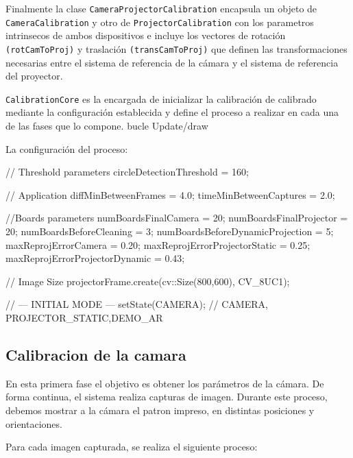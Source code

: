 Finalmente la clase \texttt{CameraProjectorCalibration} encapsula un objeto de  \texttt{CameraCalibration} y otro de \texttt{ProjectorCalibration} con los parametros intrinsecos de ambos dispositivos e incluye los vectores de rotación \texttt{(rotCamToProj)} y traslación \texttt{(transCamToProj)} que definen las transformaciones necesarias entre el sistema de referencia de la cámara y el sistema de referencia del proyector. 

\texttt{CalibrationCore} es la encargada de inicializar la calibración de calibrado mediante la configuración establecida y define el proceso a realizar en cada una de las fases que lo compone.  bucle Update/draw

La configuración del proceso:
\begin{listing}[
  float=ht,
  language = C++,
  caption  = {Configuración de la clase CalibrationCore},
  label    = code:CalibCore]
  // Threshold parameters
  circleDetectionThreshold = 160;
  
  // Application
  diffMinBetweenFrames = 4.0; 
  timeMinBetweenCaptures = 2.0; 
  
  //Boards parameters
  numBoardsFinalCamera = 20;  
  numBoardsFinalProjector = 20;
  numBoardsBeforeCleaning = 3;  
  numBoardsBeforeDynamicProjection = 5; 
  maxReprojErrorCamera = 0.20;
  maxReprojErrorProjectorStatic = 0.25;
  maxReprojErrorProjectorDynamic = 0.43;

  // Image Size
  projectorFrame.create(cv::Size(800,600), CV_8UC1);
  
  // --- INITIAL MODE ---
  setState(CAMERA); // CAMERA, PROJECTOR_STATIC,DEMO_AR
\end{listing}
  
\subsection{Calibracion de la camara}
En esta primera fase el objetivo es obtener los parámetros de la cámara. De forma continua, el sistema realiza capturas de imagen. Durante este proceso, debemos mostrar a la cámara el patron impreso, en distintas posiciones y orientaciones. 

Para cada imagen capturada, se realiza el siguiente proceso:

